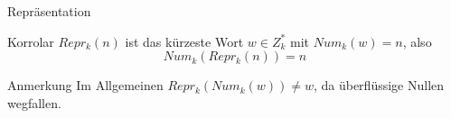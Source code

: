 \begin{frame}{Repräsentation}
	\begin{block}{Korrolar}
		$Repr_k(n)$ ist das kürzeste Wort $w\in Z_k^\ast$ mit $Num_k(w)=n$, also 
		$$ Num_k\left( Repr_k(n)\right) = n $$
	\end{block}

	\begin{alertblock}{Anmerkung}
		Im Allgemeinen  $Repr_k\left(Num_k(w)\right) \neq w $, da überflüssige Nullen wegfallen.
	\end{alertblock}
	


\end{frame}

